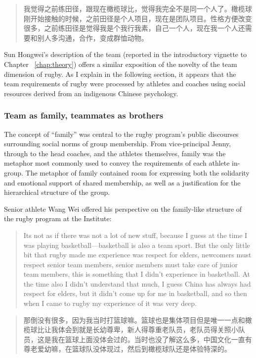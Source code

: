 \begin{CJK}{UTF8}{gbsn}
      \begin{quotation}
        我觉得之前练田径，跟现在橄榄球比，觉得我完全不是同一个人了。橄榄球刚开始接触的时候，之前田径是个人项目，现在是团队项目。性格方便改变很多，之前练田径是觉得我是个我行我素，自己一个人，现在我一个人还需要和别人多沟通，合作，变成群恤动物。
      \end{quotation}

Sun Hongwei's description of the team (reported in the introductory vignette to Chapter ~\ref{chap:theory}) offers a similar exposition of the novelty of the team dimension of rugby. As I explain in the following section, it appears that the team requirements of rugby were processed by athletes and coaches using social resources derived from an indigenous Chinese psychology.


\subsubsection{Team as family, teammates as brothers}
The concept of ``family'' was central to the rugby program's public discourses surrounding social norms of group membership.  From vice-principal Jenny, through to the head coaches, and the athletes themselves, family was the metaphor most commonly used to convey the requirements of each athlete in-group.  The metaphor of family contained room for expressing both the solidarity and emotional support of shared membership, as well as a justification for the hierarchical structure of the group.

Senior athlete Wang Wei offered his perspective on the family-like structure of the rugby program at the Institute:

  \begin{quotation}
    Its not as if there was not a lot of new stuff, because I guess at the time I was playing basketball---basketball is also a team sport.  But the only little bit that rugby made me experience was respect for elders, newcomers must respect senior team members, senior members must take care of junior team members, this is something that I didn’t experience in basketball.  At the time also I didn’t understand that much, I guess China has always had respect for elders, but it didn’t come up for me in basketball, and so then when I came to rugby my experience of it was very deep.
  \end{quotation}

  \begin{quotation}
     那倒没有很多，因为我当时打篮球嘛。篮球也是集体项目但是唯一一点和橄榄球比让我体会到就是长幼尊卑，新人得尊重老队员，老队员得关照小队员，这是我在篮球上面没体会过的。当时也没了解这么多，中国文化一直有尊老爱幼嘛，在篮球队没体现过，然后到橄榄球队还是体验特深的。
  \end{quotation}


\end{CJK}
